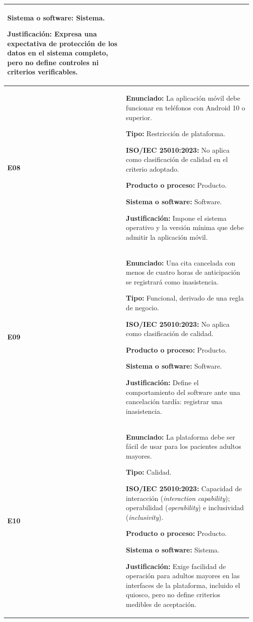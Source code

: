 \documentclass[11pt,a4paper]{article}
\begin{document}
\begin{longtable}{|
    p{}|
    p{}|}
\textbf{Sistema o software:} Sistema.

\textbf{Justificación:}
Expresa una expectativa de protección de los
datos en el sistema completo, pero no define
controles ni criterios verificables.
\\
\hline

\textbf{E08} &
\textbf{Enunciado:}
La aplicación móvil debe funcionar en teléfonos
con Android 10 o superior.

\textbf{Tipo:} Restricción de plataforma.

\textbf{ISO/IEC 25010:2023:}
No aplica como clasificación de calidad
en el criterio adoptado.

\textbf{Producto o proceso:} Producto.

\textbf{Sistema o software:} Software.

\textbf{Justificación:}
Impone el sistema operativo y la versión mínima
que debe admitir la aplicación móvil.
\\
\hline

\textbf{E09} &
\textbf{Enunciado:}
Una cita cancelada con menos de cuatro horas
de anticipación se registrará como inasistencia.

\textbf{Tipo:} Funcional, derivado de una
regla de negocio.

\textbf{ISO/IEC 25010:2023:}
No aplica como clasificación de calidad.

\textbf{Producto o proceso:} Producto.

\textbf{Sistema o software:} Software.

\textbf{Justificación:}
Define el comportamiento del software ante una
cancelación tardía: registrar una inasistencia.
\\
\hline

\textbf{E10} &
\textbf{Enunciado:}
La plataforma debe ser fácil de usar para
los pacientes adultos mayores.

\textbf{Tipo:} Calidad.

\textbf{ISO/IEC 25010:2023:}
Capacidad de interacción
(\textit{interaction capability});
operabilidad (\textit{operability}) e
inclusividad (\textit{inclusivity}).

\textbf{Producto o proceso:} Producto.

\textbf{Sistema o software:} Sistema.

\textbf{Justificación:}
Exige facilidad de operación para adultos
mayores en las interfaces de la plataforma,
incluido el quiosco, pero no define criterios
medibles de aceptación.
\\
\hline


\end{longtable}
\end{document}
